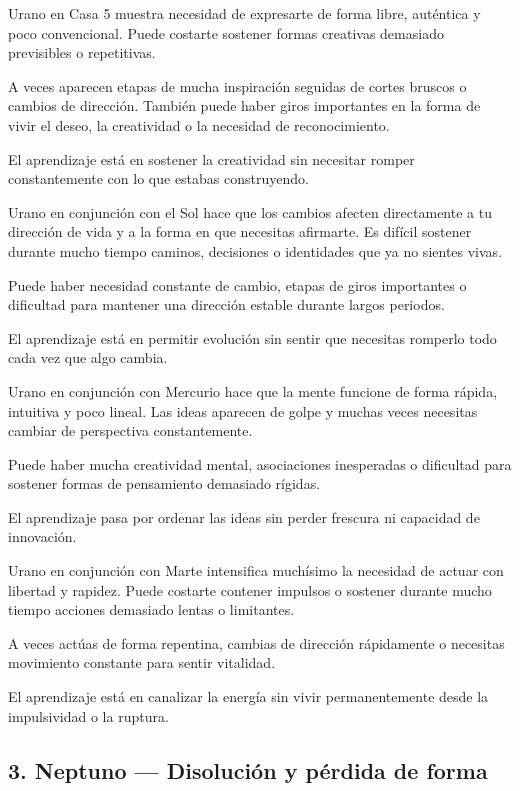 \documentclass[11pt,a4paper]{article}
\begin{document}
Urano en Casa 5 muestra necesidad de expresarte de forma libre, auténtica y poco convencional. Puede costarte sostener formas creativas demasiado previsibles o repetitivas.

A veces aparecen etapas de mucha inspiración seguidas de cortes bruscos o cambios de dirección. También puede haber giros importantes en la forma de vivir el deseo, la creatividad o la necesidad de reconocimiento.

El aprendizaje está en sostener la creatividad sin necesitar romper constantemente con lo que estabas construyendo.

Urano en conjunción con el Sol hace que los cambios afecten directamente a tu dirección de vida y a la forma en que necesitas afirmarte. Es difícil sostener durante mucho tiempo caminos, decisiones o identidades que ya no sientes vivas.

Puede haber necesidad constante de cambio, etapas de giros importantes o dificultad para mantener una dirección estable durante largos periodos.

El aprendizaje está en permitir evolución sin sentir que necesitas romperlo todo cada vez que algo cambia.

Urano en conjunción con Mercurio hace que la mente funcione de forma rápida, intuitiva y poco lineal. Las ideas aparecen de golpe y muchas veces necesitas cambiar de perspectiva constantemente.

Puede haber mucha creatividad mental, asociaciones inesperadas o dificultad para sostener formas de pensamiento demasiado rígidas.

El aprendizaje pasa por ordenar las ideas sin perder frescura ni capacidad de innovación.

Urano en conjunción con Marte intensifica muchísimo la necesidad de actuar con libertad y rapidez. Puede costarte contener impulsos o sostener durante mucho tiempo acciones demasiado lentas o limitantes.

A veces actúas de forma repentina, cambias de dirección rápidamente o necesitas movimiento constante para sentir vitalidad.

El aprendizaje está en canalizar la energía sin vivir permanentemente desde la impulsividad o la ruptura.

\vspace{0.8cm}

\subsection{3. Neptuno — Disolución y pérdida de forma}
\end{document}
